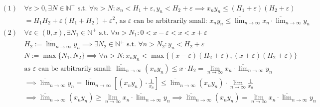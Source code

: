 \documentclass{article}
\newcommand{\st}{\mbox{ s.t. }}
\newcommand{\0}{{\bf{0}}}
\begin{document}
\begin{equation}
\begin{split}
    (1)\,&\forall\varepsilon>0,\exists N\in\mathbb{N}^+\st\forall n>N:x_n<H_1+\varepsilon,y_n<H_2+\varepsilon\implies x_ny_n\le(H_1+\varepsilon)(H_2+\varepsilon)\\
    &=H_1H_2+\varepsilon(H_1+H_2)+\varepsilon^2\mbox{, as }\varepsilon\mbox{ can be arbitrarily small: }x_ny_n\le\overline{\lim}_{n\to\infty}x_n\cdot\overline{\lim}_{n\to\infty}y_n\\
    (2)\,&\forall\varepsilon\in(0,x),\exists N_1\in\mathbb{N}^+\st\forall n>N_1:0<x-\varepsilon<x<x+\varepsilon\\
    &H_2:=\overline{\lim}_{n\to\infty}y_n\implies\exists N_2\in\mathbb{N}^+\mbox{ s.t. }\forall n>N_2:y_n<H_2+\varepsilon\\
    &N:=\max\{N_1,N_2\}\implies\forall n>N:x_ny_n<\max\{(x-\varepsilon)(H_2+\varepsilon),(x+\varepsilon)(H_2+\varepsilon)\}\\
    &\mbox{as }\varepsilon\mbox{ can be arbitrarily small: }\overline{\lim}_{n\to\infty}(x_ny_n)\le x\cdot H_2=\lim_{n\to\infty}x_n\cdot\overline{\lim}_{n\to\infty}y_n\\
    &\implies\overline{\lim}_{n\to\infty}y_n=\overline{\lim}_{n\to\infty}\left[(x_ny_n)\cdot\frac{1}{x_n}\right]\le\overline{\lim}_{n\to\infty}(x_ny_n)\cdot\lim_{n\to\infty}\frac{1}{x_n}\\
    &\implies\overline{\lim}_{n\to\infty}(x_ny_n)\geq\lim_{n\to\infty}x_n\cdot\overline{\lim}_{n\to\infty}y_n\implies\overline{\lim}_{n\to\infty}(x_ny_n)=\lim_{n\to\infty}x_n\cdot\overline{\lim}_{n\to\infty}y_n
\end{split}
\end{equation}
\end{document}
